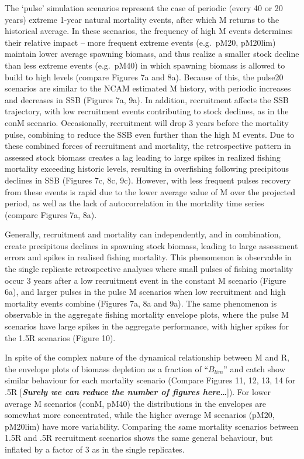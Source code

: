 \documentclass[12pt,]{article}
\begin{document}
The `pulse' simulation scenarios represent the case of periodic (every
40 or 20 years) extreme 1-year natural mortality events, after which M
returns to the historical average. In these scenarios, the frequency of
high M events determines their relative impact -- more frequent extreme
events (e.g.~pM20, pM20lim) maintain lower average spawning biomass, and
thus realize a smaller stock decline than less extreme events
(e.g.~pM40) in which spawning biomass is allowed to build to high levels
(compare Figures 7a and 8a). Because of this, the pulse20 scenarios are
similar to the NCAM estimated M history, with periodic increases and
decreases in SSB (Figures 7a, 9a). In addition, recruitment affects the
SSB trajectory, with low recruitment events contributing to stock
declines, as in the conM scenario. Occasionally, recruitment will drop 3
years before the mortality pulse, combining to reduce the SSB even
further than the high M events. Due to these combined forces of
recruitment and mortality, the retrospective pattern in assessed stock
biomass creates a lag leading to large spikes in realized fishing
mortality exceeding historic levels, resulting in overfishing following
precipitous declines in SSB (Figures 7c, 8c, 9c). However, with less
frequent pulses recovery from these events is rapid due to the lower
average value of M over the projected period, as well as the lack of
autocorrelation in the mortality time series (compare Figures 7a, 8a).

Generally, recruitment and mortality can independently, and in
combination, create precipitous declines in spawning stock biomass,
leading to large assessment errors and spikes in realised fishing
mortality. This phenomenon is observable in the single replicate
retrospective analyses where small pulses of fishing mortality occur 3
years after a low recruitment event in the constant M scenario (Figure
6a), and larger pulses in the pulse M scenarios when low recruitment and
high mortality events combine (Figures 7a, 8a and 9a). The same
phenomenon is observable in the aggregate fishing mortality envelope
plots, where the pulse M scenarios have large spikes in the aggregate
performance, with higher spikes for the 1.5R scenarios (Figure 10).

In spite of the complex nature of the dynamical relationship between M
and R, the envelope plots of biomass depletion as a fraction of
``\(B_{lim}\)'' and catch show similar behaviour for each mortality
scenario (Compare Figures 11, 12, 13, 14 for .5R {[}\textbf{\emph{Surely
we can reduce the number of figures here\ldots{}}}{]}). For lower
average M scenarios (conM, pM40) the distributions in the envelopes are
somewhat more concentrated, while the higher average M scenarios (pM20,
pM20lim) have more variability. Comparing the same mortality scenarios
between 1.5R and .5R recruitment scenarios shows the same general
behaviour, but inflated by a factor of 3 as in the single replicates.
\end{document}
